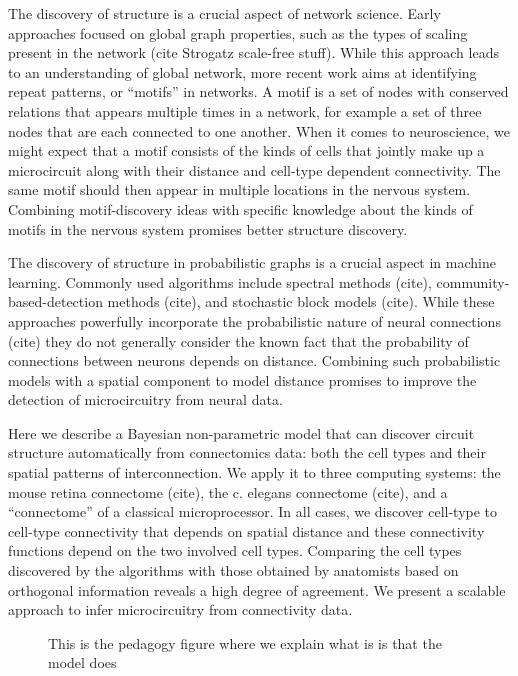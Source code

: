 \documentclass{article}
\begin{document}
The discovery of structure is a crucial aspect of network
science. Early approaches focused on global graph properties, such as
the types of scaling present in the network (cite Strogatz scale-free
stuff).  While this approach leads to an understanding of global
network, more recent work aims at identifying repeat patterns, or
“motifs” in networks. A motif is a set of nodes with conserved
relations that appears multiple times in a network, for example a set
of three nodes that are each connected to one another. When it comes
to neuroscience, we might expect that a motif consists of the kinds of
cells that jointly make up a microcircuit along with their distance
and cell-type dependent connectivity. The same motif should then
appear in multiple locations in the nervous system. Combining
motif-discovery ideas with specific knowledge about the kinds of
motifs in the nervous system promises better structure discovery.

The discovery of structure in probabilistic graphs is a crucial aspect
in machine learning. Commonly used algorithms include spectral methods
(cite), community-based-detection methods (cite), and stochastic block
models (cite). While these approaches powerfully incorporate the
probabilistic nature of neural connections (cite) they do not
generally consider the known fact that the probability of connections
between neurons depends on distance. Combining such probabilistic
models with a spatial component to model distance promises to improve
the detection of microcircuitry from neural data.

Here we describe a Bayesian non-parametric model that can discover
circuit structure automatically from connectomics data: both the cell
types and their spatial patterns of interconnection. We apply it to
three computing systems: the mouse retina connectome (cite), the
c. elegans connectome (cite), and a ``connectome'' of a classical
microprocessor. In all cases, we discover cell-type to cell-type
connectivity that depends on spatial distance and these connectivity
functions depend on the two involved cell types. Comparing the cell
types discovered by the algorithms with those obtained by anatomists
based on orthogonal information reveals a high degree of agreement. We
present a scalable approach to infer microcircuitry from connectivity
data.

\begin{figure}
  \centering 
  \caption{This is the pedagogy figure where we explain what is is that the model does }
\end{figure}
\end{document}
